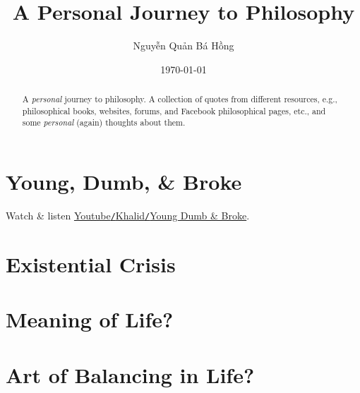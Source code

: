 \documentclass{article}
\title{A Personal Journey to Philosophy}
\author{Nguyễn Quản Bá Hồng}
\date{\today}
\numberwithin{equation}{section}
\begin{document}
\maketitle
\begin{abstract}
	A \textit{personal} journey to philosophy. A collection of quotes from different resources, e.g., philosophical books, websites, forums, and Facebook philosophical pages, etc., and some \textit{personal} (again) thoughts about them.
\end{abstract}
\tableofcontents


\section{Young, Dumb, \& Broke}
Watch \& listen \href{https://www.youtube.com/watch?v=IPfJnp1guPc}{Youtube\texttt{/}Khalid\texttt{/}Young Dumb \& Broke}.

\section{Existential Crisis}

\section{Meaning of Life?}

\section{Art of Balancing in Life?}


\begin{thebibliography}{99}
	\bibitem[]{}
\end{thebibliography}

\printbibliography[heading=bibintoc]
	
\end{document}
